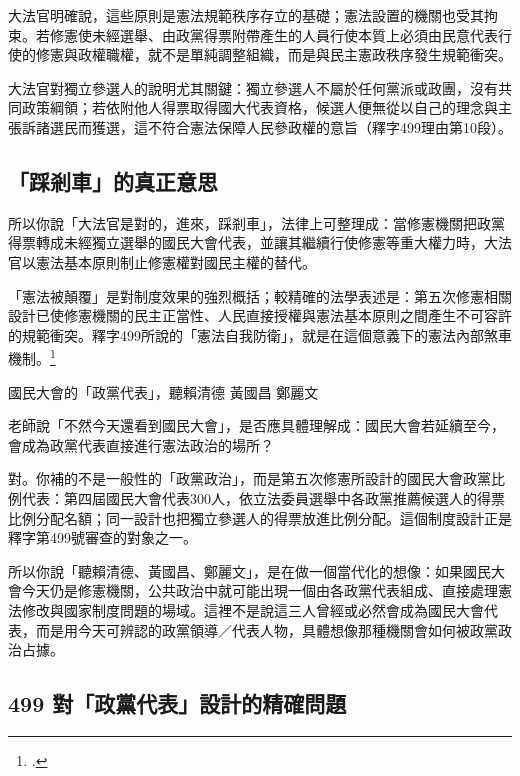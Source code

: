 大法官明確說，這些原則是憲法規範秩序存立的基礎；憲法設置的機關也受其拘束。若修憲使未經選舉、由政黨得票附帶產生的人員行使本質上必須由民意代表行使的修憲與政權職權，就不是單純調整組織，而是與民主憲政秩序發生規範衝突。

大法官對獨立參選人的說明尤其關鍵：獨立參選人不屬於任何黨派或政團，沒有共同政策綱領；若依附他人得票取得國大代表資格，候選人便無從以自己的理念與主張訴諸選民而獲選，這不符合憲法保障人民參政權的意旨（釋字499理由第10段）。

\subsection{「踩剎車」的真正意思}

所以你說「大法官是對的，進來，踩剎車」，法律上可整理成：當修憲機關把政黨得票轉成未經獨立選舉的國民大會代表，並讓其繼續行使修憲等重大權力時，大法官以憲法基本原則制止修憲權對國民主權的替代。

「憲法被顛覆」是對制度效果的強烈概括；較精確的法學表述是：第五次修憲相關設計已使修憲機關的民主正當性、人民直接授權與憲法基本原則之間產生不可容許的規範衝突。釋字499所說的「憲法自我防衛」，就是在這個意義下的憲法內部煞車機制。\footcite[理由書第 9 至 11 段]{jy499}


\begin{qaprompt}
國民大會的「政黨代表」，聽賴清德 黃國昌 鄭麗文
\end{qaprompt}

\begin{qaquestion}
老師說「不然今天還看到國民大會」，是否應具體理解成：國民大會若延續至今，會成為政黨代表直接進行憲法政治的場所？
\end{qaquestion}

對。你補的不是一般性的「政黨政治」，而是第五次修憲所設計的國民大會政黨比例代表：第四屆國民大會代表300人，依立法委員選舉中各政黨推薦候選人的得票比例分配名額；同一設計也把獨立參選人的得票放進比例分配。這個制度設計正是釋字第499號審查的對象之一。

所以你說「聽賴清德、黃國昌、鄭麗文」，是在做一個當代化的想像：如果國民大會今天仍是修憲機關，公共政治中就可能出現一個由各政黨代表組成、直接處理憲法修改與國家制度問題的場域。這裡不是說這三人曾經或必然會成為國民大會代表，而是用今天可辨認的政黨領導／代表人物，具體想像那種機關會如何被政黨政治占據。

\subsection{499 對「政黨代表」設計的精確問題}

